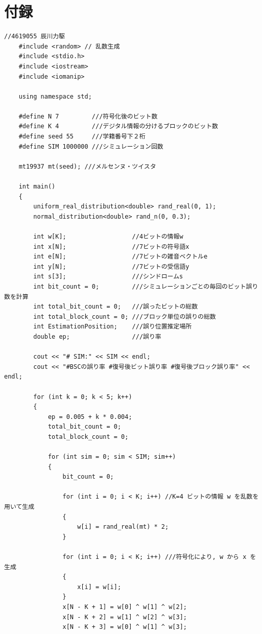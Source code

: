 \documentclass[12pt]{jarticle}
\begin{document}
\section{付録}
\begin{lstlisting}[style = lstcpp,caption=kadai3\_3.cpp]
    //4619055 辰川力駆
    #include <random> // 乱数生成
    #include <stdio.h>
    #include <iostream>
    #include <iomanip>
    
    using namespace std;
    
    #define N 7         ///符号化後のビット数
    #define K 4         ///デジタル情報の分けるブロックのビット数
    #define seed 55     ///学籍番号下２桁
    #define SIM 1000000 ///シミュレーション回数
    
    mt19937 mt(seed); ///メルセンヌ・ツイスタ
    
    int main()
    {
        uniform_real_distribution<double> rand_real(0, 1);
        normal_distribution<double> rand_n(0, 0.3);
    
        int w[K];                  //4ビットの情報w
        int x[N];                  //7ビットの符号語x
        int e[N];                  //7ビットの雑音ベクトルe
        int y[N];                  //7ビットの受信語y
        int s[3];                  ///シンドロームs
        int bit_count = 0;         ///シミュレーションごとの毎回のビット誤り数を計算
        int total_bit_count = 0;   ///誤ったビットの総数
        int total_block_count = 0; ///ブロック単位の誤りの総数
        int EstimationPosition;    ///誤り位置推定場所
        double ep;                 ///誤り率
    
        cout << "# SIM:" << SIM << endl;
        cout << "#BSCの誤り率 #復号後ビット誤り率 #復号後ブロック誤り率" << endl;
    
        for (int k = 0; k < 5; k++)
        {
            ep = 0.005 + k * 0.004;
            total_bit_count = 0;
            total_block_count = 0;
    
            for (int sim = 0; sim < SIM; sim++)
            {
                bit_count = 0;
    
                for (int i = 0; i < K; i++) //K=4 ビットの情報 w を乱数を用いて生成
                {
                    w[i] = rand_real(mt) * 2;
                }
    
                for (int i = 0; i < K; i++) ///符号化により, w から x を生成
                {
                    x[i] = w[i];
                }
                x[N - K + 1] = w[0] ^ w[1] ^ w[2];
                x[N - K + 2] = w[1] ^ w[2] ^ w[3];
                x[N - K + 3] = w[0] ^ w[1] ^ w[3];
    

\end{lstlisting}
\end{document}
